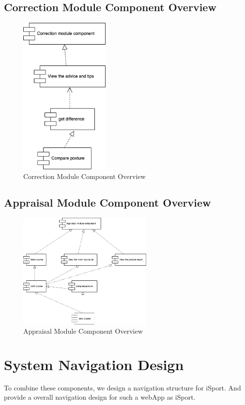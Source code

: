 \documentclass[16pt]{scrreprt}
\begin{document}
\subsection{Correction Module Component Overview}
\begin{figure}[H]
    \centering
    \includegraphics[width=0.4\textwidth]{diagrams/correction.png}
    \caption{Correction Module Component Overview}
\end{figure}

\subsection{Appraisal Module Component Overview}
\begin{figure}[H]
    \centering
    \includegraphics[width=0.6\textwidth]{diagrams/appraisal.png}
    \caption{Appraisal Module Component Overview}
\end{figure}

\section{System Navigation Design}
To combine these components, we design a navigation structure for iSport. And provide a overall navigation design for such a webApp as iSport. \\
\end{document}
